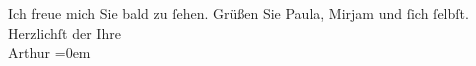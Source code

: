 \begin{ledgroupsized}[t]{13cm}
           \pstart
           Ich freue mich Sie bald zu ſehen.\pend
           \pstart
           Grüßen Sie Paula, Mirjam und ſich ſelbſt.\pend
           \pstart
           Herzlichſt der Ihre{\\[\baselineskip]}\spacefill\mbox{Arthur}\pend
           \leftskip=0em{}
         
         \endnumbering{}\end{ledgroupsized}  \newcommand{\dateiname}{L00798}\newcommand{\titel}{Arthur Schnitzler an Richard Beer-Hofmann, 2. 6. 1898}\newcommand{\editorInnen}{Martin Anton Müller und Gerd-Hermann Susen}
      